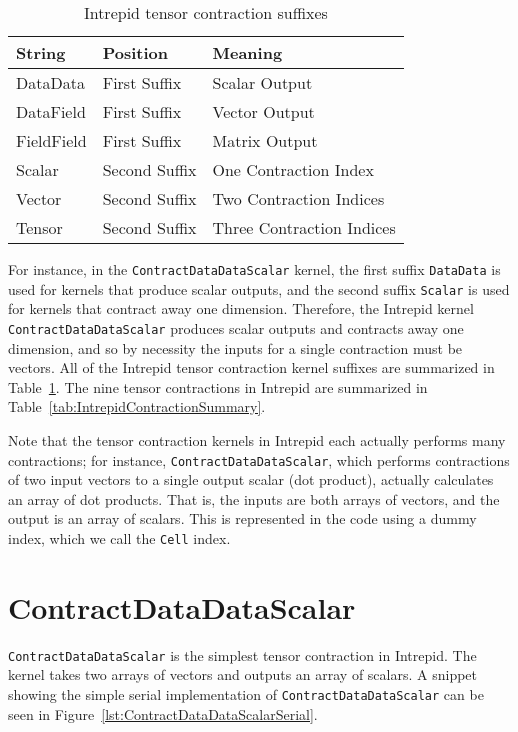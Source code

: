 \begin{table}[ht]
    \begin{center}
        \begin{tabular} {| l | l | l |}
            \hline
            \textbf{String} & \textbf{Position} & \textbf{Meaning} \\
            \hline
            DataData    & First Suffix  & Scalar Output    \\
            DataField   & First Suffix  & Vector Output    \\
            FieldField  & First Suffix  & Matrix Output    \\
            Scalar      & Second Suffix & One Contraction Index \\
            Vector      & Second Suffix & Two Contraction Indices \\
            Tensor      & Second Suffix & Three Contraction Indices \\
            \hline
        \end{tabular}
    \end{center}
\caption{Intrepid tensor contraction suffixes
\label{tab:IntrepidNamingConvention}}
\end{table}

For instance, in the \texttt{ContractDataDataScalar} kernel, the first suffix
\texttt{DataData} is used for kernels that produce scalar outputs, and the
second suffix \texttt{Scalar} is used for kernels that contract away one
dimension.  Therefore, the Intrepid kernel \texttt{ContractDataDataScalar}
produces scalar outputs and contracts away one dimension, and so by necessity
the inputs for a single contraction must be vectors.  All of the Intrepid tensor
contraction kernel suffixes are summarized in
Table~\ref{tab:IntrepidNamingConvention}.  The nine tensor contractions in
Intrepid are summarized in Table~\ref{tab:IntrepidContractionSummary}.

Note that the tensor contraction kernels in Intrepid each actually performs many
contractions; for instance, \texttt{ContractDataDataScalar}, which performs
contractions of two input vectors to a single output scalar (dot product),
actually calculates an array of dot products.  That is, the inputs are both
arrays of vectors, and the output is an array of scalars.  This is represented
in the code using a dummy index, which we call the \texttt{Cell} index.

\section{ContractDataDataScalar}
\texttt{ContractDataDataScalar} is the simplest tensor contraction in Intrepid.
The kernel takes two arrays of vectors and outputs an array of scalars. A
snippet showing the simple serial implementation of
\texttt{ContractDataDataScalar} can be seen in
Figure~\ref{lst:ContractDataDataScalarSerial}.

